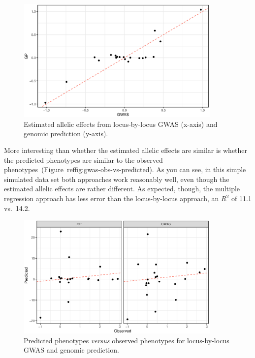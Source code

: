 \documentclass[12pt]{article}
\begin{document}
\begin{figure}
  \begin{center}
    \includegraphics[width=10cm]{gwas-vs-gp.eps}
  \end{center}
  \caption{Estimated allelic effects from locus-by-locus GWAS (x-axis)
    and genomic prediction (y-axis).}\label{fig:gwas-vs-gp}
\end{figure}

More interesting than whether the estimated allelic effects are
similar is whether the predicted phenotypes are similar to the
observed phenotypes~(Figure~ref{fig:gwas-obs-vs-predicted}). As you
can see, in this simple simulated data set both approaches work
reasonably well, even though the estimated allelic effects are rather
different. As expected, though, the multiple regression approach has
less error than the locus-by-locus approach, an $R^2$ of 11.1 vs.\
14.2. 

\begin{figure}
  \begin{center}
    \includegraphics[width=10cm]{gwas-obs-vs-predicted.eps}
  \end{center}
  \caption{Predicted phenotypes {\it versus\/} observed phenotypes for
    locus-by-locus GWAS and genomic prediction.}\label{fig:gwas-obs-vs-predicted}
\end{figure}
\end{document}
